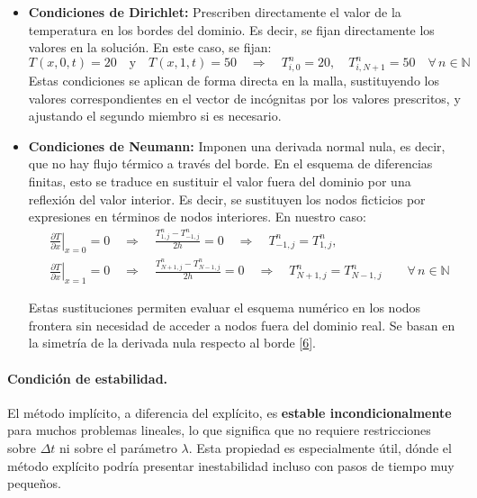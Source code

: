 \documentclass{article}
\begin{document}
\begin{itemize}
    \item \textbf{Condiciones de Dirichlet:} Prescriben directamente el valor de la temperatura en los bordes del dominio. Es decir, se fijan directamente los valores en la solución. En este caso, se fijan:
    $$
    T(x, 0, t) = 20 \quad \text{y} \quad T(x, 1, t) = 50 
    \quad \Longrightarrow \quad 
    T_{i,0}^n = 20, \quad T_{i,N+1}^n = 50 \quad \forall\, n \in \mathbb{N}
    $$
    Estas condiciones se aplican de forma directa en la malla, sustituyendo los valores correspondientes en el vector de incógnitas por los valores prescritos, y ajustando el segundo miembro si es necesario.

    \item \textbf{Condiciones de Neumann:} Imponen una derivada normal nula, es decir, que no hay flujo térmico a través del borde. En el esquema de diferencias finitas, esto se traduce en sustituir el valor fuera del dominio por una reflexión del valor interior. Es decir, se sustituyen los nodos ficticios por expresiones en términos de nodos interiores. En nuestro caso:
    $$
    \begin{aligned}
    &\left. \frac{\partial T}{\partial x} \right|_{x=0} = 0 
    \quad \Longrightarrow \quad 
    \frac{T_{1,j}^n - T_{-1,j}^n}{2h} = 0 
    \quad \Longrightarrow \quad 
    T_{-1,j}^n = T_{1,j}^n, \\
    &\left. \frac{\partial T}{\partial x} \right|_{x=1} = 0 
    \quad \Longrightarrow \quad 
    \frac{T_{N+1,j}^n - T_{N-1,j}^n}{2h} = 0 
    \quad \Longrightarrow \quad 
    T_{N+1,j}^n = T_{N-1,j}^n 
    \qquad \forall\, n \in \mathbb{N}
    \end{aligned}
    $$

    Estas sustituciones permiten evaluar el esquema numérico en los nodos frontera sin necesidad de acceder a nodos fuera del dominio real. Se basan en la simetría de la derivada nula respecto al borde [\href{https://www.dmae.upct.es/~paredes/calcnum/apuntes/apuntes_tema_7.pdf}{6}].
\end{itemize}

\paragraph{Condición de estabilidad.} El método implícito, a diferencia del explícito, es \textbf{estable incondicionalmente} para muchos problemas lineales, lo que significa que no requiere restricciones sobre $\Delta t$ ni sobre el parámetro $\lambda$. Esta propiedad es especialmente útil, dónde el método explícito podría presentar inestabilidad incluso con pasos de tiempo muy pequeños.
\end{document}
